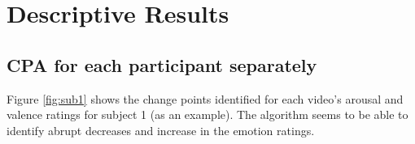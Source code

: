 \documentclass[11pt, letterpaper]{article}
\begin{document}
\section{Descriptive Results} \label{results}

\subsection{CPA for each participant separately}
Figure \ref{fig:sub1} shows the change points identified for each video's arousal and valence ratings for subject 1 (as an example). The algorithm seems to be able to identify abrupt decreases and increase in the emotion ratings.
\end{document}
